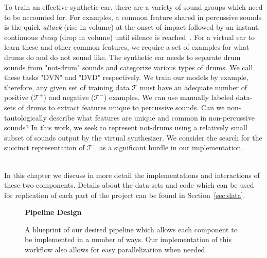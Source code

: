 \documentclass[\main/thesis.tex]{subfiles}
\begin{document}
To train an effective synthetic ear, there are a variety of sound groups which need to be accounted for. For examples, a common feature shared in percussive sounds is the quick \emph{attack} (rise in volume) at the onset of impact followed by an instant, continuous \emph{decay} (drop in volume) until silence is reached~\cite{barry2005drum}. For a virtual ear to learn these and other common features, we require a set of examples for what drums do and do not sound like. The synthetic ear needs to separate drum sounds from "not-drum" sounds and categorize various types of drums. We call these tasks "DVN" and "DVD" respectively. We train our models by example, therefore, any given set of training data $\mathcal{T}$ must have an adequate number of positive ($\mathcal{T^{+}}$) and negative ($\mathcal{T^{-}}$) examples. We can use manually labeled data-sets of drums to extract features unique to percussive sounds. Can we non-tautologically describe what features are unique and common in non-percussive sounds? In this work, we seek to represent not-drums using a relatively small subset of sounds output by the virtual synthesizer. We consider the search for the succinct representation of $\mathcal{T^{-}}$ as a significant hurdle in our implementation.


\\
In this chapter we discuss in more detail the implementations and interactions of these two components. Details about the data-sets and code which can be used for replication of each part of the project can be found in Section~\ref{sec:data}.

 \begin{figure}[t!]
    \begin{center}
    \textbf{Pipeline Design}
    \end{center}
    \caption{A blueprint of our desired pipeline which allows each component to be implemented in a number of ways. Our implementation of this workflow also allows for easy parallelization when needed.
    }
\label{fig:pipeline_outline}
\end{figure}
\end{document}
